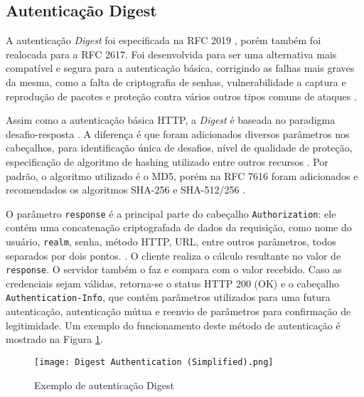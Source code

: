 \subsection{Autenticação Digest}

A autenticação \emph{Digest} foi especificada na RFC 2019 \cite{RFC2019}, porém também foi 
realocada para a RFC 2617. Foi desenvolvida para ser uma alternativa mais compatível e segura  para 
a autenticação básica, corrigindo as falhas mais graves da mesma, como a falta de criptografia de 
senhas, vulnerabilidade a captura e reprodução de pacotes e proteção contra vários outros tipos 
comuns de ataques \cite{GOURLEY2002}.

Assim como a autenticação básica HTTP, a \emph{Digest} é baseada no paradigma 
desafio-resposta \cite{RFC7616}. A diferença é que foram adicionados diversos parâmetros nos 
cabeçalhos, para identificação única de desafios, nível de qualidade de proteção, especificação de 
algoritmo de hashing utilizado entre outros recursos \cite{CHAPMAN2012}. Por padrão, o algoritmo 
utilizado é o MD5, porém na RFC 7616 foram adicionados e recomendados os algoritmos SHA-256 e 
SHA-512/256 \cite{RFC7616}.

O parâmetro \texttt{response} é a principal parte do cabeçalho \texttt{Authorization}: ele contém 
uma concatenação criptografada de dados da requisição, como nome do usuário, \texttt{realm}, senha, 
método HTTP, URL, entre outros parâmetros, todos separados por dois pontos. \cite{CHAPMAN2012}. O 
cliente realiza o cálculo resultante no valor de \texttt{response}. O servidor também o faz e 
compara com o valor recebido. Caso as credenciais sejam válidas, retorna-se o status HTTP 200 (OK)
e o cabeçalho \texttt{Authentication-Info}, que contém parâmetros utilizados para uma futura 
autenticação, autenticação mútua e reenvio de parâmetros para confirmação de legitimidade. Um 
exemplo do funcionamento deste método de autenticação é mostrado na Figura \ref{fig:digestAuth}.

\begin{figure}[ht]
  \centering
  \texttt{[image: Digest Authentication (Simplified).png]}
  \caption{Exemplo de autenticação Digest}
  \label{fig:digestAuth}
\end{figure}